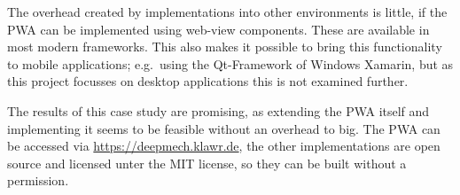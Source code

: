 The overhead created by implementations into other environments is little, if the PWA can be implemented using web-view components.
These are available in most modern frameworks.
This also makes it possible to bring this functionality to mobile applications; e.g.\ using the Qt-Framework of Windows Xamarin, but as this project focusses on desktop applications this is not examined further.

The results of this case study are promising, as extending the PWA itself and implementing it seems to be feasible without an overhead to big.
The PWA can be accessed via \url{https://deepmech.klawr.de}, the other implementations are open source and licensed unter the MIT license, so they can be built without a permission.

